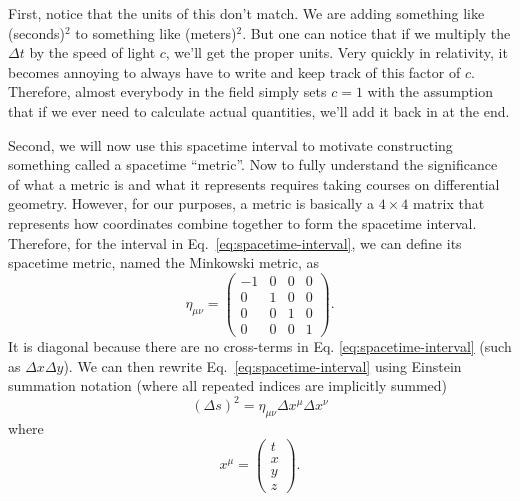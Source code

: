\begin{bibunit}[unsrtnat]
First, notice that the units of this don't match. We are adding something like
(seconds)$^2$ to something like (meters)$^2$. But one can notice that if we
multiply the $\Delta t$ by the speed of light $c$, we'll get the proper units.
Very quickly in relativity, it becomes annoying to always have to write and keep
track of this factor of $c$. Therefore, almost everybody in the field simply
sets $c=1$ with the assumption that if we ever need to calculate actual
quantities, we'll add it back in at the end.

Second, we will now use this spacetime interval to motivate constructing
something called a spacetime ``metric''. Now to fully understand the significance of what
a metric is and what it represents requires taking courses on differential
geometry. However, for our purposes, a metric is basically a $4\times 4$ matrix
that represents how coordinates combine together to form the spacetime interval.
Therefore, for the interval in Eq.~\ref{eq:spacetime-interval}, we can define
its spacetime metric, named the Minkowski metric, as
\begin{equation}
   \eta_{\mu\nu} =\left(
   \begin{matrix}
      -1 & 0 & 0 & 0 \\
       0 & 1 & 0 & 0 \\
       0 & 0 & 1 & 0 \\
       0 & 0 & 0 & 1
   \end{matrix}
   \right).
\end{equation}
It is diagonal because there are no cross-terms in Eq.
\ref{eq:spacetime-interval} (such as $\Delta x\Delta y$). We can then rewrite
Eq.~\ref{eq:spacetime-interval} using Einstein summation notation (where all
repeated indices are implicitly summed)
\begin{equation}
   (\Delta s)^2 = \eta_{\mu\nu}\Delta x^\mu\Delta x^\nu
\end{equation}
where
\begin{equation}
   x^\mu =\left(
   \begin{matrix}
      t \\
      x \\
      y \\
      z
   \end{matrix}
   \right).
\end{equation}


\end{bibunit}
